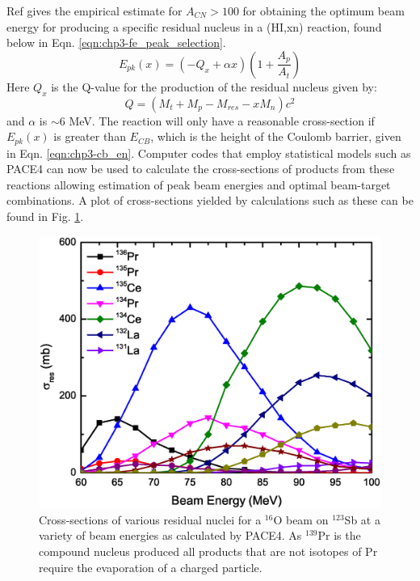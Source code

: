 Ref \cite{nucSpecAndReacPartC} gives the empirical estimate for $A_{CN}>100$ for obtaining the optimum beam energy for producing a specific residual nucleus in a (HI,xn) reaction, found below in Eqn. \ref{eqn:chp3-fe_peak_selection}.
\begin{equation}
\label{eqn:chp3-fe_peak_selection}
E_{pk}(x)=(-Q_{x} + \alpha{}x)(1+\frac{A_p}{A_t})
\end{equation}
Here $Q_x$ is the Q-value for the production of the residual nucleus given by:
\begin{equation}
\label{eqn:chp3-res_qvalue}
Q = (M_t+M_p-M_{res}-x M_n)c^2
\end{equation}
and $\alpha$ is $\sim6$ MeV. The reaction will only have a reasonable cross-section if $E_{pk}(x)$ is greater than $E_{CB}$, which is the height of the Coulomb barrier, given in Eqn. \ref{eqn:chp3-cb_en}. Computer codes that employ statistical models such as PACE4\cite{PACE4,PACE4_2} can now be used to calculate the cross-sections of products from these reactions allowing estimation of peak beam energies and optimal beam-target combinations. A plot of cross-sections yielded by calculations such as these can be found in Fig. \ref{fig:chp3-pace4-calc}.

\begin{figure}[h!]
	\centerline{\includegraphics[width=\textwidth]{./img/c3/135Pr_calc_plot.eps}}
	\caption{Cross-sections of various residual nuclei for a $^{16}$O beam on $^{123}$Sb at a variety of beam energies as calculated by PACE4. As $^{139}$Pr is the compound nucleus produced all products that are not isotopes of Pr require the evaporation of a charged particle.}
	\label{fig:chp3-pace4-calc}
\end{figure}

